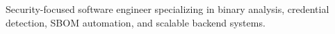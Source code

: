 

\begin{cvparagraph}

Security-focused software engineer specializing in binary analysis, credential detection, SBOM automation, and scalable backend systems.
\end{cvparagraph}
